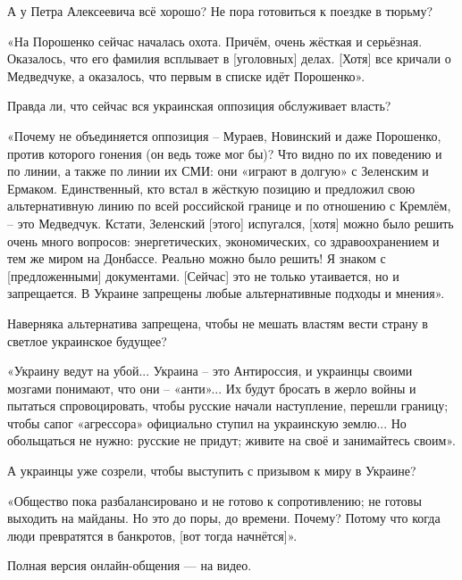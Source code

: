 А у Петра Алексеевича всё хорошо? Не пора готовиться к поездке в тюрьму?

«На Порошенко сейчас началась охота. Причём, очень жёсткая и серьёзная.
Оказалось, что его фамилия всплывает в [уголовных] делах. [Хотя] все кричали о
Медведчуке, а оказалось, что первым в списке идёт Порошенко».

Правда ли, что сейчас вся украинская оппозиция обслуживает власть?

«Почему не объединяется оппозиция – Мураев, Новинский и даже Порошенко, против
которого гонения (он ведь тоже мог бы)? Что видно по их поведению и по линии, а
также по линии их СМИ: они «играют в долгую» с Зеленским и Ермаком.
Единственный, кто встал в жёсткую позицию и предложил свою альтернативную линию
по всей российской границе и по отношению с Кремлём, – это Медведчук. Кстати,
Зеленский [этого] испугался, [хотя] можно было решить очень много вопросов:
энергетических, экономических, со здравоохранением и тем же миром на Донбассе.
Реально можно было решить! Я знаком с [предложенными] документами. [Сейчас] это
не только утаивается, но и запрещается. В Украине запрещены любые
альтернативные подходы и мнения».

Наверняка альтернатива запрещена, чтобы не мешать властям вести страну в
светлое украинское будущее?

«Украину ведут на убой... Украина – это Антироссия, и украинцы своими мозгами
понимают, что они – «анти»... Их будут бросать в жерло войны и пытаться
спровоцировать, чтобы русские начали наступление, перешли границу; чтобы сапог
«агрессора» официально ступил на украинскую землю... Но обольщаться не нужно:
русские не придут; живите на своё и занимайтесь своим».

А украинцы уже созрели, чтобы выступить с призывом к миру в Украине?

«Общество пока разбалансировано и не готово к сопротивлению; не готовы выходить
на майданы. Но это до поры, до времени. Почему? Потому что когда люди
превратятся в банкротов, [вот тогда начнётся]».

Полная версия онлайн-общения — на видео.
